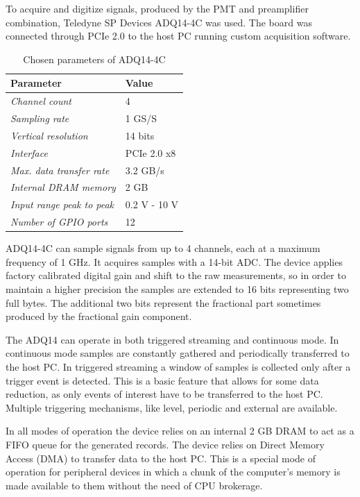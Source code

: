 To acquire and digitize signals, produced by the PMT and preamplifier
combination, Teledyne SP Devices ADQ14-4C was used. The board was connected
through PCIe 2.0 to the host PC running custom acquisition software.
\begin{table}[H]
\caption{Chosen parameters of ADQ14-4C}
\centering
  \begin{tabular}{l | l}
  {\bfseries Parameter} & {\bfseries Value}\\
  \hline
  \textit {Channel count}             & 4 \\ \hline
  \textit {Sampling rate}  & 1 GS/S \\ \hline
  \textit {Vertical resolution}   & 14 bits\\ \hline
  \textit {Interface}         & PCIe 2.0 x8\\ \hline
  \textit {Max. data transfer rate}         & 3.2 GB/s\\ \hline
  \textit {Internal DRAM memory}      & 2 GB\\ \hline
  \textit {Input range peak to peak}   & 0.2 V - 10 V\\ \hline
  \textit {Number of GPIO ports}         & 12\\ 
  \end{tabular}
  \label{tab:adq14_datasheet}
\end{table}


ADQ14-4C can sample signals from up to 4 channels, each at a maximum
frequency of 1 GHz. It acquires samples with a 14-bit ADC.
The device applies factory calibrated digital gain and shift
to the raw measurements, 
so in order to maintain a higher precision the samples are 
extended to 16 bits representing two full bytes. 
The additional two bits represent the fractional part sometimes
produced by the fractional gain component.


The ADQ14 can operate in both triggered streaming and continuous mode.
In continuous mode samples are constantly gathered and periodically
transferred to the host PC. In triggered streaming a window of samples is 
collected only after a trigger event is detected. This is a basic feature
that allows for some data reduction, as only events of interest have to
be transferred to the host PC. Multiple triggering mechanisms, 
like level, periodic and external are available.


In all modes of operation the device relies on an internal 2 GB DRAM
to act as a FIFO queue for the generated records.
The device relies on Direct Memory Access (DMA) to transfer
data to the host PC. This is a special mode of operation for 
peripheral devices in which a chunk of the computer's memory is
made available to them without the need of CPU brokerage.


